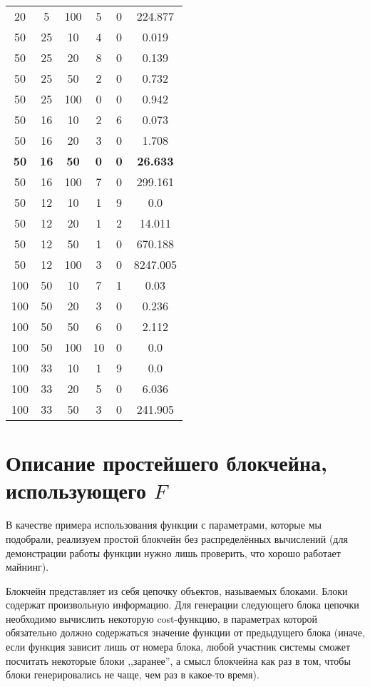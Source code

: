 \documentclass{article}
\begin{document}
\begin{table}
\begin{center}
\begin{tabular}{cccccc}
20 & 5 & 100 & 5 & 0 & 224.877\\
50 & 25 & 10 & 4 & 0 & 0.019\\
50 & 25 & 20 & 8 & 0 & 0.139\\
50 & 25 & 50 & 2 & 0 & 0.732\\
50 & 25 & 100 & 0 & 0 & 0.942\\
50 & 16 & 10 & 2 & 6 & 0.073\\
50 & 16 & 20 & 3 & 0 & 1.708\\
\textbf{50} & \textbf{16} & \textbf{50} & \textbf{0} & \textbf{0} & \textbf{26.633}\\
50 & 16 & 100 & 7 & 0 & 299.161\\
50 & 12 & 10 & 1 & 9 & 0.0\\
50 & 12 & 20 & 1 & 2 & 14.011\\
50 & 12 & 50 & 1 & 0 & 670.188\\
50 & 12 & 100 & 3 & 0 & 8247.005\\
100 & 50 & 10 & 7 & 1 & 0.03\\
100 & 50 & 20 & 3 & 0 & 0.236\\
100 & 50 & 50 & 6 & 0 & 2.112\\
100 & 50 & 100 & 10 & 0 & 0.0\\
100 & 33 & 10 & 1 & 9 & 0.0\\
100 & 33 & 20 & 5 & 0 & 6.036\\
100 & 33 & 50 & 3 & 0 & 241.905\\
\end{tabular}
\end{center}
\end{table}

\section{Описание простейшего блокчейна, использующего $F$}

    В качестве примера использования функции с параметрами, которые мы подобрали, реализуем простой блокчейн без распределённых вычислений (для демонстрации работы функции нужно лишь проверить, что хорошо работает майнинг).

    Блокчейн представляет из себя цепочку объектов, называемых блоками. Блоки содержат произвольную информацию. Для генерации следующего блока цепочки необходимо вычислить некоторую cost-функцию, в параметрах которой обязательно должно содержаться значение функции от предыдущего блока (иначе, если функция зависит лишь от номера блока, любой участник системы сможет посчитать некоторые блоки ,,заранее'', а смысл блокчейна как раз в том, чтобы блоки генерировались не чаще, чем раз в какое-то время).
\end{document}

